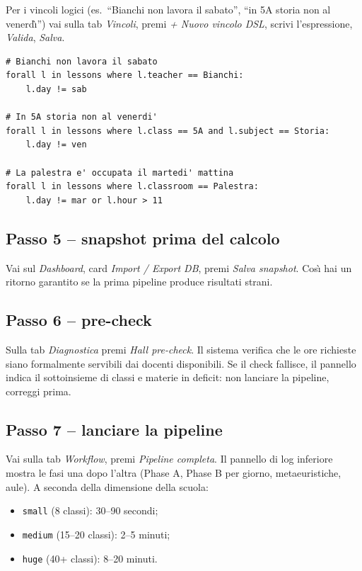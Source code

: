 Per i vincoli logici (es.\ ``Bianchi non lavora il sabato'',
``in 5A storia non al venerd\`{\i}'') vai sulla tab
\emph{Vincoli}, premi \emph{+ Nuovo vincolo DSL}, scrivi
l'espressione, \emph{Valida}, \emph{Salva}.

\begin{esempiobox}[title={Vincoli ricorrenti, in DSL}]
\begin{lstlisting}
# Bianchi non lavora il sabato
forall l in lessons where l.teacher == Bianchi:
    l.day != sab

# In 5A storia non al venerdi'
forall l in lessons where l.class == 5A and l.subject == Storia:
    l.day != ven

# La palestra e' occupata il martedi' mattina
forall l in lessons where l.classroom == Palestra:
    l.day != mar or l.hour > 11
\end{lstlisting}
\end{esempiobox}

\subsection{Passo 5 -- snapshot prima del calcolo}

Vai sul \emph{Dashboard}, card \emph{Import / Export DB}, premi
\emph{Salva snapshot}. Cos\`{\i} hai un ritorno garantito se la
prima pipeline produce risultati strani.

\subsection{Passo 6 -- pre-check}

Sulla tab \emph{Diagnostica} premi \emph{Hall pre-check}. Il
sistema verifica che le ore richieste siano formalmente
servibili dai docenti disponibili. Se il check fallisce, il
pannello indica il sottoinsieme di classi e materie in deficit:
non lanciare la pipeline, correggi prima.

\subsection{Passo 7 -- lanciare la pipeline}

Vai sulla tab \emph{Workflow}, premi \emph{Pipeline completa}.
Il pannello di log inferiore mostra le fasi una dopo l'altra
(Phase A, Phase B per giorno, metaeuristiche, aule). A
seconda della dimensione della scuola:

\begin{itemize}
\item \texttt{small} (8 classi): 30--90 secondi;
\item \texttt{medium} (15--20 classi): 2--5 minuti;
\item \texttt{huge} (40+ classi): 8--20 minuti.
\end{itemize}

